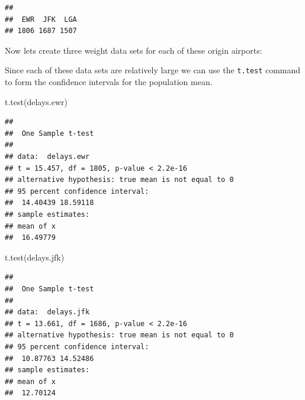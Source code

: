 \documentclass[
]{book}
\newenvironment{Shaded}{\begin{snugshade}}{\end{snugshade}}
\newcommand{\DocumentationTok}[1]{\textcolor[rgb]{0.56,0.35,0.01}{\textbf{\textit{#1}}}}
\newcommand{\FunctionTok}[1]{\textcolor[rgb]{0.00,0.00,0.00}{#1}}
\newcommand{\NormalTok}[1]{#1}
\newcommand{\OtherTok}[1]{\textcolor[rgb]{0.56,0.35,0.01}{#1}}
\newcommand{\SpecialCharTok}[1]{\textcolor[rgb]{0.00,0.00,0.00}{#1}}
\newcommand{\StringTok}[1]{\textcolor[rgb]{0.31,0.60,0.02}{#1}}
\theoremstyle{definition}
\theoremstyle{definition}
\theoremstyle{definition}
\theoremstyle{definition}
\theoremstyle{remark}
\begin{document}
\begin{verbatim}
## 
##  EWR  JFK  LGA 
## 1806 1687 1507
\end{verbatim}

Now lets create three weight data sets for each of these origin airports:

\begin{Shaded}
\end{Shaded}

Since each of these data sets are relatively large we can use the \texttt{t.test} command to form the confidence intervals for the population mean.

\begin{Shaded}
\begin{Highlighting}[]
\FunctionTok{t.test}\NormalTok{(delays.ewr)}
\end{Highlighting}
\end{Shaded}

\begin{verbatim}
## 
##  One Sample t-test
## 
## data:  delays.ewr
## t = 15.457, df = 1805, p-value < 2.2e-16
## alternative hypothesis: true mean is not equal to 0
## 95 percent confidence interval:
##  14.40439 18.59118
## sample estimates:
## mean of x 
##  16.49779
\end{verbatim}

\begin{Shaded}
\begin{Highlighting}[]
\FunctionTok{t.test}\NormalTok{(delays.jfk)}
\end{Highlighting}
\end{Shaded}

\begin{verbatim}
## 
##  One Sample t-test
## 
## data:  delays.jfk
## t = 13.661, df = 1686, p-value < 2.2e-16
## alternative hypothesis: true mean is not equal to 0
## 95 percent confidence interval:
##  10.87763 14.52486
## sample estimates:
## mean of x 
##  12.70124
\end{verbatim}
\end{document}
